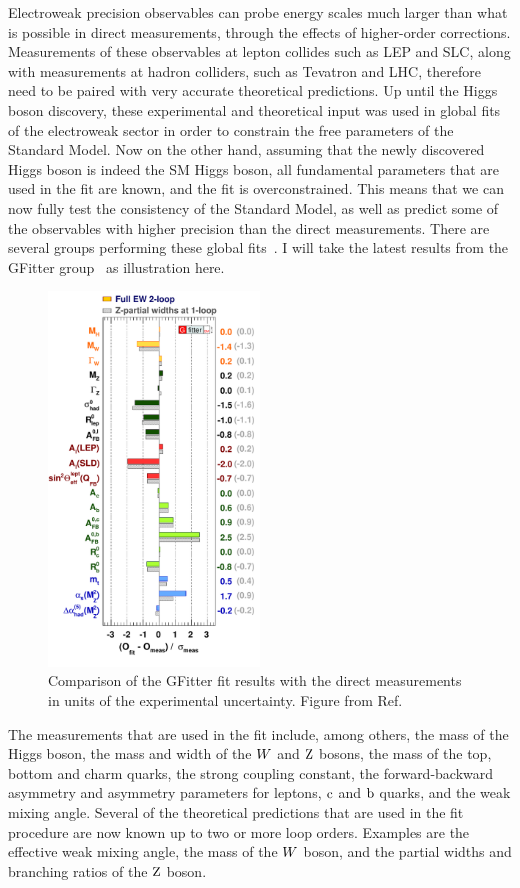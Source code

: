 Electroweak precision observables can probe energy scales much larger than what is possible in
direct measurements, through the effects of higher-order corrections. 
Measurements of these observables at lepton collides such as LEP and SLC, along with
measurements at hadron colliders, such as Tevatron and LHC, therefore need to be paired with
very accurate theoretical predictions.
Up until the Higgs boson discovery, these experimental and theoretical input was used in global fits
of the electroweak sector in order to constrain the free parameters of the Standard Model.
Now on the other hand, assuming that the newly discovered Higgs boson is indeed the SM Higgs boson,
all fundamental parameters that are used in the fit are known, and the fit is overconstrained. This
means that we can now fully test the consistency of the Standard Model, as well as predict some of
the observables with higher precision than the direct measurements. 
There are several groups performing these global
fits~\cite{CKMFitter,GFitter,ZFitter,LEPEWWG}. I will take the latest results from the GFitter
group~\cite{Baak:2014ora,Flacher:2008zq} as illustration here.

\begin{figure}
\includegraphics[width=0.5\textwidth]
{figures/standardmodel/2014_07_16_PullPlotTwoBarsTwoTheos_logo}
\caption{ Comparison of the GFitter fit results with the direct measurements in units of the
experimental uncertainty. 
Figure from Ref.~\cite{Baak:2014ora}
\label{fig:global_fit1}}
\end{figure}
The measurements that are used in the fit include, among others, the mass of the Higgs boson, the
mass and width of the $W$ and $\mathrm{Z}$ bosons, the mass of the top, bottom and charm quarks, the
strong coupling constant, the forward-backward asymmetry and asymmetry parameters for leptons,
$\mathrm{c}$ and $\mathrm{b}$ quarks, and the weak mixing angle. 
Several of the theoretical predictions that are used in the fit procedure are now known up to two
or more loop orders. Examples are the effective weak mixing angle, the mass of the $W$ boson, and
the partial widths and branching ratios of the $\mathrm{Z}$ boson. 

